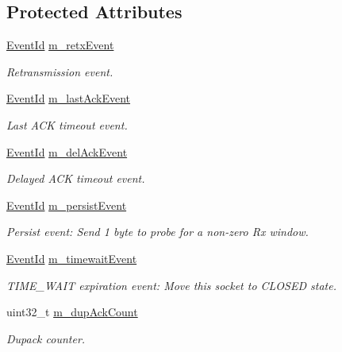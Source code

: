 \subsection*{Protected Attributes}
\begin{DoxyCompactItemize}
\item 
\hyperlink{classns3_1_1EventId}{Event\+Id} \hyperlink{classns3_1_1TcpSocketBase_a620dd547e6484bc03c6b796f589b75a6}{m\+\_\+retx\+Event}
\begin{DoxyCompactList}\small\item\em Retransmission event. \end{DoxyCompactList}\item 
\hyperlink{classns3_1_1EventId}{Event\+Id} \hyperlink{classns3_1_1TcpSocketBase_ac6933cbf3722ece8188d40a889c45649}{m\+\_\+last\+Ack\+Event}
\begin{DoxyCompactList}\small\item\em Last A\+CK timeout event. \end{DoxyCompactList}\item 
\hyperlink{classns3_1_1EventId}{Event\+Id} \hyperlink{classns3_1_1TcpSocketBase_a5069bf1f5f588a29e858b533d9ff34ab}{m\+\_\+del\+Ack\+Event}
\begin{DoxyCompactList}\small\item\em Delayed A\+CK timeout event. \end{DoxyCompactList}\item 
\hyperlink{classns3_1_1EventId}{Event\+Id} \hyperlink{classns3_1_1TcpSocketBase_ac9f9af0cce2ec51e89396146e3199b42}{m\+\_\+persist\+Event}
\begin{DoxyCompactList}\small\item\em Persist event\+: Send 1 byte to probe for a non-\/zero Rx window. \end{DoxyCompactList}\item 
\hyperlink{classns3_1_1EventId}{Event\+Id} \hyperlink{classns3_1_1TcpSocketBase_a49b5b01bd6e824835859a9983465c9f2}{m\+\_\+timewait\+Event}
\begin{DoxyCompactList}\small\item\em T\+I\+M\+E\+\_\+\+W\+A\+IT expiration event\+: Move this socket to C\+L\+O\+S\+ED state. \end{DoxyCompactList}\item 
uint32\+\_\+t \hyperlink{classns3_1_1TcpSocketBase_a4cf1d54115a5b2c8db34b62b6ccfa541}{m\+\_\+dup\+Ack\+Count}
\begin{DoxyCompactList}\small\item\em Dupack counter. \end{DoxyCompactList}\item 

\end{DoxyCompactItemize}
